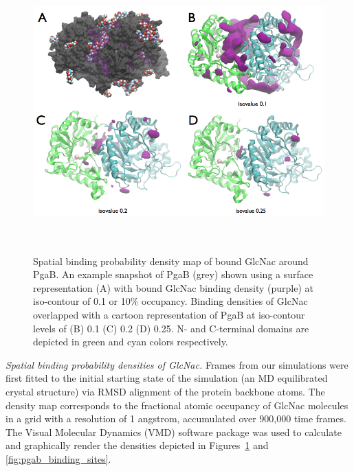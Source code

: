 \begin{figure}[pgab_density]
  \centering
  \includegraphics[height=4.25in, width=6in]{figures/results4/figure_pgab_density.png}
  \caption[NAG binding density]{Spatial binding probability density map of bound GlcNac around PgaB. An example snapshot of PgaB (grey) shown using a surface representation (A) with bound GlcNac binding density  (purple) at iso-contour of 0.1 or 10\% occupancy. Binding densities of GlcNac overlapped with a cartoon representation of PgaB at iso-contour levels of (B) 0.1 (C) 0.2 (D) 0.25. N- and C-terminal domains are depicted in green and cyan colors respectively.}
  \label{fig:pgab_density}
\end{figure}

\emph{Spatial binding probability densities of GlcNac.} Frames from our simulations were first fitted to the initial starting state of the simulation (an MD equilibrated crystal structure) via RMSD alignment of the protein backbone atoms. The density map corresponds to the fractional atomic occupancy of GlcNac molecules in a grid with a resolution of 1 angstrom, accumulated over 900,000 time frames. The Visual Molecular Dynamics (VMD) software package was used to calculate and graphically render the densities depicted in Figures~\ref{fig:pgab_density} and \ref{fig:pgab_binding_sites}.

